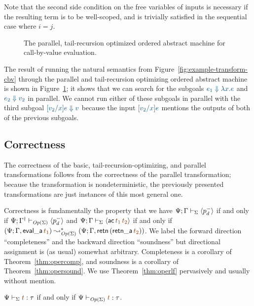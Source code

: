 \noindent
Note that the second side condition on the free variables of inputs is
necessary if the resulting term is to be well-scoped, and is trivially 
satisfied in the sequential case where $i = j$. 

\begin{figure}
\caption{The parallel, tail-recursion optimized ordered abstract machine for
 call-by-value evaluation.}
\label{fig:cbv-ev-ssos-par}
\end{figure}

The result of running the natural semantics from
Figure~\ref{fig:example-transform-cbv} through the parallel and
tail-recursion optimizing ordered abstract machine is shown in
Figure~\ref{fig:cbv-ev-ssos-par}; it shows that we can
search for the subgoals $\obj{e_1 \Downarrow \lambda x.e}$ and
$\obj{e_2 \Downarrow v_2}$ in parallel. We cannot run either
of these subgoals in parallel with the third subgoal 
$\obj{[v_2/x]e \Downarrow v}$ because the input 
$\obj{[v_2/x]e}$ mentions the outputs
of both of the previous subgoals. 

\subsection{Correctness}
\label{sec:operationalization-correct}

The correctness of the basic, tail-recursion-optimizing, and parallel
transformations follows from the correctness of the parallel
transformation; because the transformation is nondeterministic, the
previously presented transformations are just instances of this most
general one. 

Correctness is fundamentally the property that
we have ${\Psi}; {\Gamma} \vdash_{\Sigma} {\langle {p^-_d} \rangle}$ if and only if 
${\Psi}; {{{\Gamma}^\dag}} \vdash_{{\it Op}({\Sigma})} {\langle {p^-_d} \rangle}$
and $\slss{\Sigma}{\Psi}{\Gamma}{\susp{{\sf ac}\,\lf{t_1}\,\lf{t_2}}}$ if and only if
$(\Psi; \mkconj{\Gamma}{{\sf eval\_a}\,\lf{t_1}}) \leadsto^*_{\transop{\Sigma}} (\Psi; \mkconj{\Gamma}{{\sf retn}\,({\sf retn\_a}\,\lf{t_2})})$. We label the
forward direction ``completeness'' and the backward direction ``soundness''
but directional assignment is (as usual) somewhat arbitrary. 
Completeness is a corollary
of Theorem~\ref{thm:opercomp}, and soundness is a corollary of 
Theorem~\ref{thm:opersound}. We use Theorem~\ref{thm:operlf} pervasively
and usually without mention. 

\bigskip
\begin{theorem}\label{thm:operlf}
  $\Psi \vdash_\Sigma \lf{t} : \tau$ if and only if $\Psi
  \vdash_{\transop{\Sigma}} \lf{t} : \tau$.
\end{theorem}

